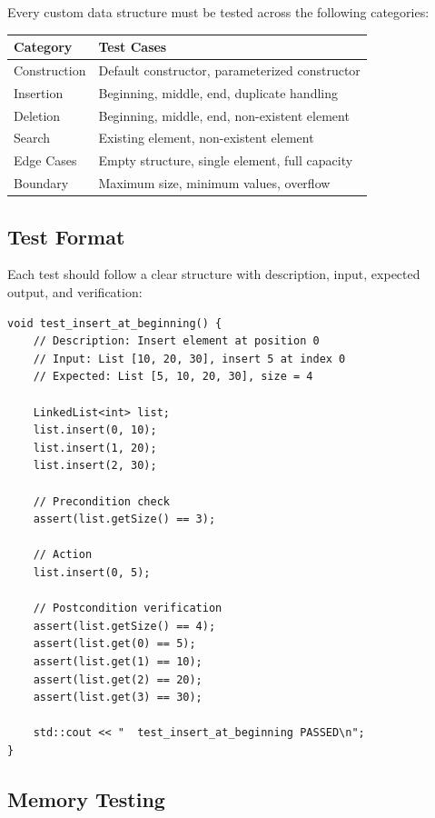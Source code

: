 Every custom data structure must be tested across the following categories:

\begin{center}
\begin{tabular}{l l}
\hline
\rowcolor{tableheader} \textbf{Category} & \textbf{Test Cases} \\
\hline
Construction & Default constructor, parameterized constructor \\
Insertion & Beginning, middle, end, duplicate handling \\
Deletion & Beginning, middle, end, non-existent element \\
Search & Existing element, non-existent element \\
Edge Cases & Empty structure, single element, full capacity \\
Boundary & Maximum size, minimum values, overflow \\
\hline
\end{tabular}
\end{center}

\subsection{Test Format}

Each test should follow a clear structure with description, input, expected output, and verification:

\begin{lstlisting}[style=cpp]
void test_insert_at_beginning() {
    // Description: Insert element at position 0
    // Input: List [10, 20, 30], insert 5 at index 0
    // Expected: List [5, 10, 20, 30], size = 4

    LinkedList<int> list;
    list.insert(0, 10);
    list.insert(1, 20);
    list.insert(2, 30);

    // Precondition check
    assert(list.getSize() == 3);

    // Action
    list.insert(0, 5);

    // Postcondition verification
    assert(list.getSize() == 4);
    assert(list.get(0) == 5);
    assert(list.get(1) == 10);
    assert(list.get(2) == 20);
    assert(list.get(3) == 30);

    std::cout << "  test_insert_at_beginning PASSED\n";
}
\end{lstlisting}

\subsection{Memory Testing}

